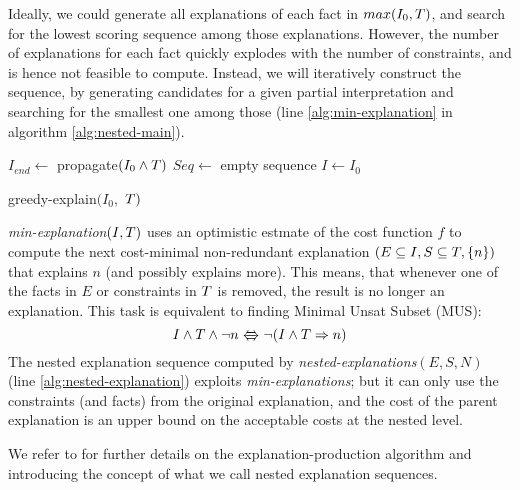 Ideally, we could generate all explanations of each fact in $max(I_0,T)$, and search for the lowest scoring sequence among those explanations.
However, the number of explanations for each fact quickly explodes with the number of constraints, and is hence not feasible to compute.
Instead, we will iteratively construct the sequence, by generating candidates for a given partial interpretation and searching for the smallest one among those (line \ref{alg:min-explanation} in algorithm \ref{alg:nested-main}).

\begin{algorithm}[ht]
  $I_{end} \gets$ propagate$(I_0\land T)$\;
  $Seq \gets$ empty sequence\;
  $I \gets I_0$\;
  \caption{greedy-explain$(I_0,$ $T)$}
  \label{alg:nested-main}
\end{algorithm}
\textit{min-explanation$(I,T)$} uses an optimistic estmate of the cost function $f$ to compute the next cost-minimal non-redundant explanation $(E \subseteq I, S \subseteq T,\{n\})$ that explains $n$ (and possibly explains more).
This means, that whenever one of the facts in $E$ or constraints in $T$ is removed, the result is no longer an explanation.
This task is equivalent to finding Minimal Unsat Subset (MUS):
\[ I \wedge \allconstraints \wedge \lnot n \xLleftRrightarrow{} \lnot (I \wedge T \Rightarrow n) \]
The nested explanation sequence computed by \textit{nested-explanations$(E,S, N)$} (line \ref{alg:nested-explanation}) exploits \textit{min-explanations}; but it can only use the constraints (and facts) from the original explanation, and the cost of the parent explanation is an upper bound on the acceptable costs at the nested level.

We refer to \cite{ecai/BogaertsGCG20} for further details on the explanation-production algorithm and \cite{bogaerts2020framework} introducing the concept of what we call nested explanation sequences.


